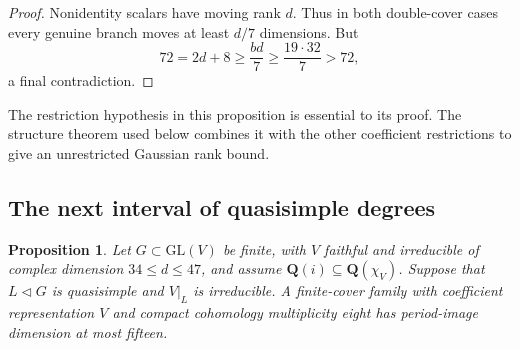 \documentclass[11pt]{article}
\newtheorem{proposition}[theorem]{Proposition}
\theoremstyle{definition}
\theoremstyle{remark}
\newcommand{\Q}{\mathbf Q}
\begin{document}
\begin{proof}
Nonidentity scalars have moving rank $d$.  Thus in both double-cover
cases every genuine branch moves at least $d/7$ dimensions.  But
\[
 72=2d+8\ge\frac{bd}{7}\ge\frac{19\cdot32}{7}>72,
\]
a final contradiction.
\end{proof}

The restriction hypothesis in this proposition is essential to its
proof. The structure theorem used below combines it with the other
coefficient restrictions to give an unrestricted Gaussian rank bound.

\subsection{The next interval of quasisimple degrees}

\begin{proposition}\label{prop:quasisimple-degrees34-47}
Let $G\subset\mathrm{GL}(V)$ be finite, with $V$ faithful and
irreducible of complex dimension $34\leq d\leq47$, and assume
$\Q(i)\subseteq\Q(\chi_V)$.  Suppose that
$L\triangleleft G$ is quasisimple and $V|_L$ is irreducible.
A finite-cover family with coefficient representation $V$ and
compact cohomology multiplicity eight has period-image dimension
at most fifteen.
\end{proposition}
\end{document}
